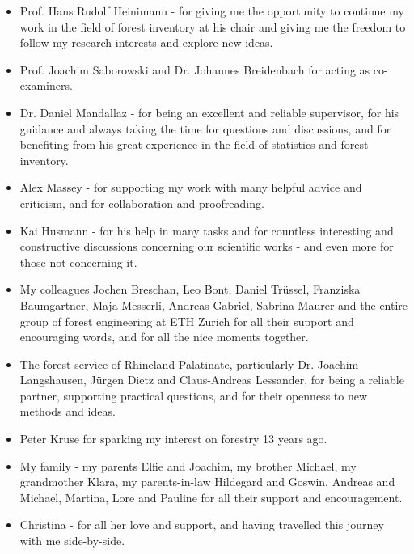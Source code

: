 \renewcommand{\labelitemi}{--}
\begin{itemize}
	\item Prof. Hans Rudolf Heinimann - for giving me the opportunity to continue my work in the field of forest inventory at his chair and giving me the freedom to follow my research interests and explore new ideas.
	
	\item Prof. Joachim Saborowski and Dr. Johannes Breidenbach for acting as co-examiners.
	
	\item Dr. Daniel Mandallaz - for being an excellent and reliable supervisor, for his guidance and always taking the time for questions and discussions, and for benefiting from his great experience in the field of statistics and forest inventory.
	
	\item Alex Massey - for supporting my work with many helpful advice and criticism, and for collaboration and proofreading.
	
	\item Kai Husmann - for his help in many tasks and for countless interesting and constructive discussions concerning our scientific works - and even more for those not concerning it.
	
	\item My colleagues Jochen Breschan, Leo Bont, Daniel Tr{\"u}ssel, Franziska Baumgartner, Maja Messerli, Andreas Gabriel, Sabrina Maurer and the entire group of forest engineering at ETH Zurich for all their support and encouraging words, and for all the nice moments together.
	
	\item The forest service of Rhineland-Palatinate, particularly Dr. Joachim Langshausen, J{\"u}rgen Dietz and Claus-Andreas Lessander, for being a reliable partner, supporting practical questions, and for their openness to new methods and ideas.
	
	\item Peter Kruse for sparking my interest on forestry 13 years ago.
	
	\item My family - my parents Elfie and Joachim, my brother Michael, my grandmother Klara, my parents-in-law Hildegard and Goswin, Andreas and Michael, Martina, Lore and Pauline for all their support and encouragement.
	
	\item Christina - for all her love and support, and having travelled this journey with me side-by-side.	
	
\end{itemize}


\newpage
